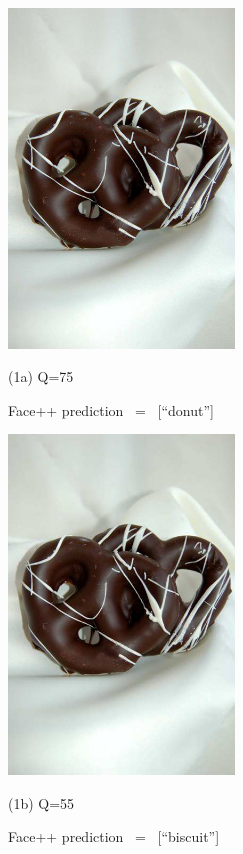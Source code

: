 \begin{figure}[htbp]
	\begin{minipage}{0.5\linewidth}
		\centerline{\includegraphics[width=6.0cm, trim=0 150 0 150, clip]{figures/donut_q75.jpeg}}
		\centerline{(1a) Q=75}
		\centerline{Face++ prediction \ = \ [``donut'']}
		\vspace{0.4cm}
	\end{minipage}
	\hfill
	\begin{minipage}{0.5\linewidth}
		\centerline{\includegraphics[width=6.0cm, trim=0 150 0 150, clip]{figures/donut_q55.jpeg}}
		\centerline{(1b) Q=55}
		\centerline{Face++ prediction \ = \ [``biscuit'']}
		\vspace{0.4cm}
	\end{minipage}

\end{figure}
